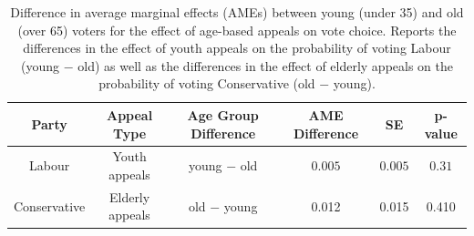 \begin{table}[htbp]
\centering
\begin{tabular}{cccccc}
\toprule
Party & Appeal Type & Age Group Difference & AME Difference & SE & p-value \\
\midrule
Labour & Youth appeals & young $-$ old & $0.005$ & $0.005$ & $0.31$ \\
Conservative & Elderly appeals & old $-$ young & 0.012 & 0.015 & 0.410 \\
\bottomrule
\end{tabular}
\caption[AME difference of age-based appeals usage on voting patterns between young and old]{Difference in average marginal effects (AMEs) between young (under 35) and old (over 65) voters for the effect of age-based appeals on vote choice. Reports the differences in the effect of youth appeals on the probability of voting Labour (young $-$ old) as well as the differences in the effect of elderly appeals on the probability of voting Conservative (old $-$ young).}
\label{tab:ame_differences}
\end{table}